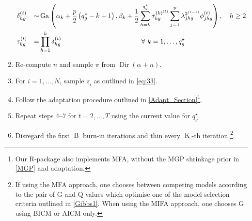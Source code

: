 \documentclass[a4paper,12pt,fleqn]{article}
\numberwithin{equation}{section}
\begin{document}
\begin{enumerate}[label*=\arabic*.]
\begin{alignat*}{4}
		&\delta_{hg}^{\left(t\right)} &\sim& \operatorname{Ga}\left(\alpha_k + \frac{p}{2}\left(q_g^\star-k+1\right), \beta_k + \frac{1}{2}\sum_{h=k}^{q_g^\star}\tau_{hg}^{\left(k\right)^{\left(t\right)}}\sum_{j=1}^p\lambda_{jhg}^{2^{\left(t-1\right)}}\phi_{jhg}^{\left(t\right)}\right),\quad h\geq 2\\
		&\tau_{kg}^{\left(t\right)} &=& \prod_{h=1}^{k}\delta_{hg}^{\left(t\right)}\quad\hspace{38mm}\forall~k=1,\ldots,q_g^\star\nonumber
		\end{alignat*}
	\item Re-compute $\underline{n}$ and sample $\underline{\pi}$ from $\operatorname{Dir}\left(\underline{\alpha} + \underline{n}\right)$.
	\item For $i=1,\ldots,N$, sample $\underline{z}_i$ as outlined in \eqref{eq:33}.
	\item Follow the adaptation procedure outlined in \ref{Adapt_Section}\footnote{Our R-package also implements MFA, without the MGP shrinkage prior in \ref{MGP} and adaptation.}.
	\item Repeat steps 4--7 for $t=2,\ldots,T$ using the current value for $q_g^\star$.
	\item Disregard the first $\operatorname{B}$ burn-in iterations and thin every $\operatorname{K}$-th iteration \footnote{If using the MFA approach, one chooses between competing models according to the pair of G and Q values which optimise one of the model selection criteria outlined in \ref{Gibbs1}. When using the MIFA approach, one chooses G using BICM or AICM only.}.
\end{enumerate}
\end{document}
